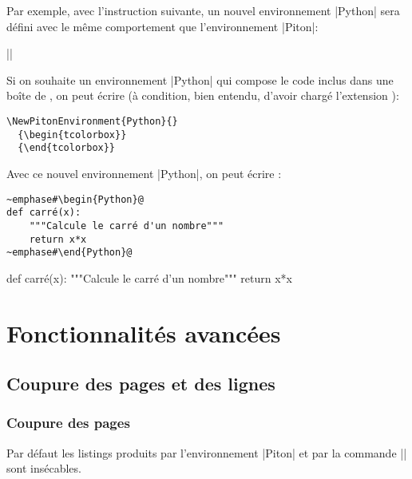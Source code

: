 \documentclass[dvipsnames,svgnames]{article}
\begin{document}
\bigskip
Par exemple, avec l'instruction suivante, un nouvel environnement |{Python}| sera défini avec le même comportement
que l'environnement |{Piton}|:

{\color{gray}||}

\bigskip
Si on souhaite un environnement |{Python}| qui compose le code inclus dans une boîte de , on peut
écrire (à condition, bien entendu, d'avoir chargé l'extension ):

\begin{Verbatim}
\NewPitonEnvironment{Python}{}
  {\begin{tcolorbox}}
  {\end{tcolorbox}}
\end{Verbatim}

\bigskip
Avec ce nouvel environnement |{Python}|, on peut écrire : 

\begin{Verbatim}
~emphase#\begin{Python}@
def carré(x):
    """Calcule le carré d'un nombre"""
    return x*x
~emphase#\end{Python}@
\end{Verbatim}

  {\begin{tcolorbox}}
  {\end{tcolorbox}}

\begin{Python}
def carré(x):
    """Calcule le carré d'un nombre"""
    return x*x
\end{Python}


\section{Fonctionnalités avancées}


\subsection{Coupure des pages et des lignes}

\label{breakable}

\subsubsection{Coupure des pages}


Par défaut les listings produits par l'environnement |{Piton}| et par la commande |\PitonInputFile| sont
insécables.
\end{document}
